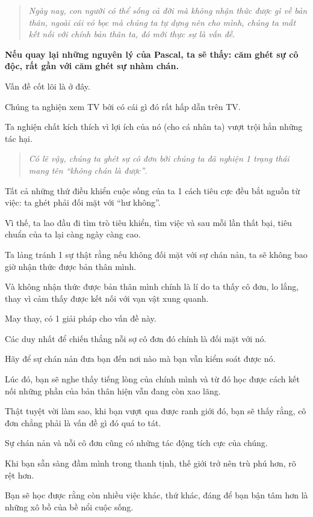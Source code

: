 \documentclass{book}
\numberwithin{equation}{section}
\begin{document}
\begin{quotation}
    \textit{Ngày nay, con người có thể sống cả đời mà không nhận thức được gì về bản thân, ngoài cái vỏ bọc mà chúng ta tự dựng nên cho mình, chúng ta mất kết nối với chính bản thân ta, đó mới thực sự là vấn đề}.
\end{quotation}
\textbf{Nếu quay lại những nguyên lý của Pascal, ta sẽ thấy: căm ghét sự cô độc, rất gần với căm ghét sự nhàm chán.}

%
Vấn đề cốt lõi là ở đây.

Chúng ta nghiện xem TV bởi có cái gì đó rất hấp dẫn trên TV.

Ta nghiện chất kích thích vì lợi ích của nó (cho cá nhân ta) vượt trội hẳn những tác hại.

\begin{quotation}
    \textit{Có lẽ vậy, chúng ta ghét sự cô đơn bởi chúng ta đã nghiện 1 trạng thái mang tên ``không chán là được''}.
\end{quotation}
Tất cả những thứ điều khiển cuộc sống của ta 1 cách tiêu cực đều bắt nguồn từ việc: ta ghét phải đối mặt với ``hư không''.

Vì thế, ta lao đầu đi tìm trò tiêu khiển, tìm việc và sau mỗi lần thất bại, tiêu chuẩn của ta lại càng ngày càng cao.

Ta lảng tránh 1 sự thật rằng nếu không đối mặt với sự chán nản, ta sẽ không bao giờ nhận thức được bản thân mình.

Và không nhận thức được bản thân mình chính là lí do ta thấy cô đơn, lo lắng, thay vì cảm thấy được kết nối với vạn vật xung quanh.

%
May thay, có 1 giải pháp cho vấn đề này.

Các duy nhất để chiến thắng nỗi sợ cô đơn đó chính là đối mặt với nó.

Hãy để sự chán nản đưa bạn đến nơi nào mà bạn vẫn kiểm soát được nó.

Lúc đó, bạn sẽ nghe thấy tiếng lòng của chính mình và từ đó học được cách kết nối những phần của bản thân hiện vẫn đang còn xao lãng.

%
Thật tuyệt vời làm sao, khi bạn vượt qua được ranh giới đó, bạn sẽ thấy rằng, cô đơn chẳng phải là vấn đề gì đó quá to tát.

Sự chán nản và nỗi cô đơn cũng có những tác động tích cực của chúng.

Khi bạn sẵn sàng đầm mình trong thanh tịnh, thế giới trở nên trù phú hơn, rõ rệt hơn.

%
Bạn sẽ học được rằng còn nhiều việc khác, thứ khác, đáng để bạn bận tâm hơn là những xô bồ của bề nổi cuộc sống.
\end{document}
